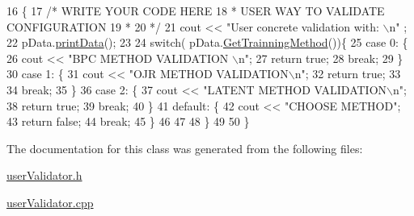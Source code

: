 \begin{DoxyCode}
16                                                           \{
17     \textcolor{comment}{/*  WRITE YOUR CODE HERE}
18 \textcolor{comment}{     * USER WAY TO VALIDATE CONFIGURATION}
19 \textcolor{comment}{     * }
20 \textcolor{comment}{     */}
21     cout << \textcolor{stringliteral}{"User concrete validation with: \(\backslash\)n"} ;
22     pData.\hyperlink{classConfigData_acf8c34f47f52ee33edbb758f795ba5a3}{printData}();
23     
24     \textcolor{keywordflow}{switch}( pData.\hyperlink{classConfigData_a41a99ccfad14823c0e269c5a77573ddb}{GetTrainningMethod}())\{
25         \textcolor{keywordflow}{case} 0: \{
26             cout << \textcolor{stringliteral}{"BPC METHOD VALIDATION \(\backslash\)n"};
27             \textcolor{keywordflow}{return} \textcolor{keyword}{true};
28             \textcolor{keywordflow}{break};
29         \}
30         \textcolor{keywordflow}{case} 1: \{
31             cout << \textcolor{stringliteral}{"OJR METHOD VALIDATION\(\backslash\)n"};
32             \textcolor{keywordflow}{return} \textcolor{keyword}{true};
33 
34             \textcolor{keywordflow}{break};
35         \}
36         \textcolor{keywordflow}{case} 2: \{
37             cout << \textcolor{stringliteral}{"LATENT METHOD VALIDATION\(\backslash\)n"};
38             \textcolor{keywordflow}{return} \textcolor{keyword}{true};
39             \textcolor{keywordflow}{break};
40         \}
41         \textcolor{keywordflow}{default}: \{
42             cout << \textcolor{stringliteral}{"CHOOSE METHOD"};
43             \textcolor{keywordflow}{return} \textcolor{keyword}{false};
44             \textcolor{keywordflow}{break};
45         \}
46             
47     
48     \}
49 
50 \}
\end{DoxyCode}


The documentation for this class was generated from the following files\+:\begin{DoxyCompactItemize}
\item 
\hyperlink{userValidator_8h}{user\+Validator.\+h}\item 
\hyperlink{userValidator_8cpp}{user\+Validator.\+cpp}\end{DoxyCompactItemize}
